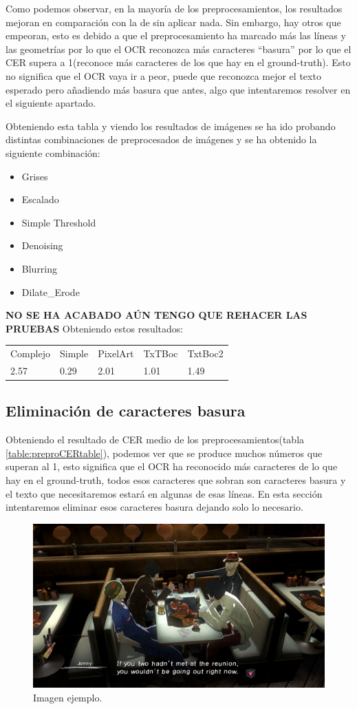 Como podemos observar, en la mayoría de los preprocesamientos, los resultados mejoran en comparación con la de sin aplicar nada. Sin embargo, hay otros que empeoran, esto es debido a que el preprocesamiento ha marcado más las líneas y las geometrías por lo que el OCR reconozca más caracteres ``basura'' por lo que el CER supera a 1(reconoce más caracteres de los que hay en el ground-truth). Esto no significa que el OCR vaya ir a peor, puede que reconozca mejor el texto esperado pero añadiendo más basura que antes, algo que intentaremos resolver en el siguiente apartado. 

Obteniendo esta tabla y viendo los resultados de imágenes se ha ido probando distintas combinaciones de preprocesados de imágenes y se ha obtenido la siguiente combinación:
\begin{itemize}
	\item Grises
	\item Escalado
	\item Simple Threshold
	\item Denoising
	\item Blurring
	\item Dilate\_Erode	
\end{itemize}
\textbf{NO SE HA ACABADO AÚN TENGO QUE REHACER LAS PRUEBAS}
Obteniendo estos resultados:
\begin{table}[H]
	\begin{tabular}{lllll}
		Complejo & Simple & PixelArt & TxTBoc & TxtBoc2                      \\
		2.57     & 0.29   & 2.01     & 1.01   & 1.49
	\end{tabular}
\end{table}
\subsection{Eliminación de caracteres basura}
Obteniendo el resultado de CER medio de los preprocesamientos(tabla \ref{table:preproCERtable}), podemos ver que se produce muchos números que superan al 1, esto significa que el OCR ha reconocido más caracteres de lo que hay en el ground-truth, todos esos caracteres que sobran son caracteres basura y el texto que necesitaremos estará en algunas de esas líneas. En esta sección intentaremos eliminar esos caracteres basura dejando solo lo necesario.
\begin{figure}[H]
	\centering
	\includegraphics[width = 1\textwidth]{Imagenes/Sample_Trash_Char.png}
	\caption{Imagen ejemplo.}
	\label{fig:Trash_Char}
\end{figure}

